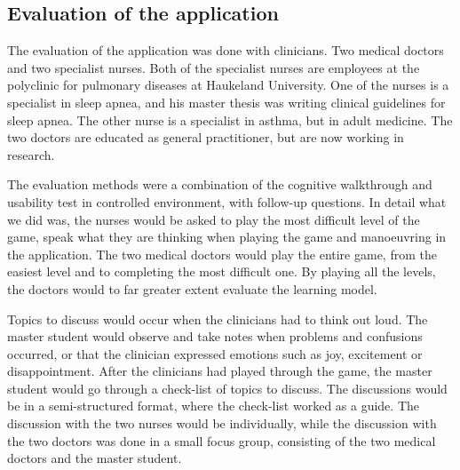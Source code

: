 \subsection{Evaluation of the application}
The evaluation of the application was done with clinicians.	Two medical doctors and two specialist nurses. Both of the specialist nurses are employees at the polyclinic for pulmonary diseases at Haukeland University. One of the nurses is a specialist in sleep apnea, and his master thesis was writing clinical guidelines for sleep apnea. The other nurse is a specialist in asthma, but in adult medicine. The two doctors are educated as general practitioner, but are now working in research.

The evaluation methods were a combination of the cognitive walkthrough and usability test in controlled environment, with follow-up questions. In detail what we did was, the nurses would be asked to play the most difficult level of the game, speak what they are thinking when playing the game and manoeuvring in the application.  The two medical doctors would play the entire game, from the easiest level and to completing the most difficult one. By playing all the levels, the doctors would to far greater extent evaluate the learning model.

Topics to discuss would occur when the clinicians had to think out loud. The master student would observe and take notes when problems and confusions occurred, or that the clinician expressed emotions such as joy, excitement or disappointment. After the clinicians had played through the game, the master student would go through a check-list of topics to discuss. The discussions would be in a semi-structured format, where the check-list worked as a guide. The discussion with the two nurses would be individually, while  the discussion with the two doctors was done in a small focus group, consisting of the two medical doctors and the master student. 

